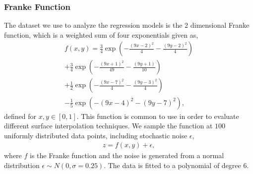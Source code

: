 \documentclass[english,notitlepage,reprint,nofootinbib]{revtex4-2}  %
\begin{document}
\subsubsection*{Franke Function}
The dataset we use to analyze the regression models is the 2 dimensional Franke function, which is a weighted sum of four exponentials given as, 
\begin{align}\label{eq: frankie}
    f(x,y) = \frac{3}{4} \exp\left(
             -\frac{{\left( 9x-2\right)}^2}{4}
             -\frac{{\left( 9y-2\right)}^2}{4}
             \right) 
             \\ 
            +\frac{3}{4} \exp\left(
             -\frac{{\left( 9x+1\right)}^2}{49}
             -\frac{{\left( 9y+1\right)}}{10}
             \right) \nonumber
             \\ 
            +\frac{1}{2} \exp\left(
             -\frac{{\left( 9x-7\right)}^2}{4}
             -\frac{{\left( 9y-3\right)}^2}{4}
             \right) \nonumber
             \\ 
            -\frac{1}{5} \exp\left(
            -{\left(9x-4\right)}^2 - {\left(9y-7\right)}^2
             \right), \nonumber
\end{align}
defined for $x,y\in [0,1]$. 
This function is common to use in order to evaluate different surface interpolation techniques. 
We sample the function at $100$ uniformly distributed data points, including stochastic noise $\epsilon$, 
\begin{align*}
    z = f(x,y) + \epsilon, 
\end{align*}
where $f$ is the Franke function and the noise is generated from a normal distribution $\epsilon\sim N(0,\sigma=0.25)$. 
The data is fitted to a polynomial of degree $6$. 
\end{document}
